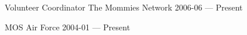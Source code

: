 


\begin{cventries}

  \cventry
    {Volunteer Coordinator} %
    {The Mommies Network} %
    {} %
    {2006-06 — Present} %
    {}


  \cventry
    {MOS} %
    {Air Force} %
    {} %
    {2004-01 — Present} %
    {}


\end{cventries}

